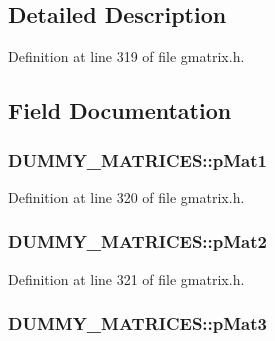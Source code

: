 \subsection{Detailed Description}


Definition at line 319 of file gmatrix.\-h.



\subsection{Field Documentation}
\hypertarget{structDUMMY__MATRICES_a83b2fec22eaa2674a6360711702d28ac}{
\subsubsection[{p\-Mat1}]{ D\-U\-M\-M\-Y\-\_\-\-M\-A\-T\-R\-I\-C\-E\-S\-::p\-Mat1}}\label{structDUMMY__MATRICES_a83b2fec22eaa2674a6360711702d28ac}


Definition at line 320 of file gmatrix.\-h.

\hypertarget{structDUMMY__MATRICES_ada47a9e57f8f5e60971d1d7a888d66b0}{
\subsubsection[{p\-Mat2}]{ D\-U\-M\-M\-Y\-\_\-\-M\-A\-T\-R\-I\-C\-E\-S\-::p\-Mat2}}\label{structDUMMY__MATRICES_ada47a9e57f8f5e60971d1d7a888d66b0}


Definition at line 321 of file gmatrix.\-h.

\hypertarget{structDUMMY__MATRICES_ac7b2907eca9bdceb1b78dc5ffb1f8299}{
\subsubsection[{p\-Mat3}]{ D\-U\-M\-M\-Y\-\_\-\-M\-A\-T\-R\-I\-C\-E\-S\-::p\-Mat3}}\label{structDUMMY__MATRICES_ac7b2907eca9bdceb1b78dc5ffb1f8299}


